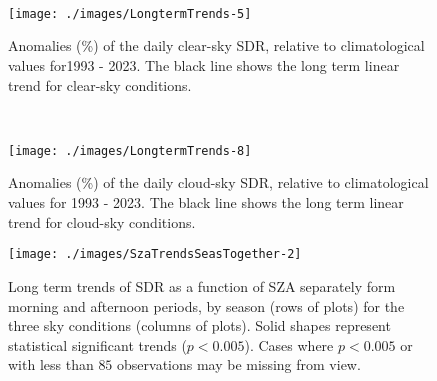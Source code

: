 \appendix
\section{}


\  \


\begin{figure}[h!]
{\centering \texttt{[image: ./images/LongtermTrends-5]}

}
\caption{Anomalies (\%) of the daily clear-sky SDR, relative to climatological values for1993 - 2023. The black line shows the long term linear trend for clear-sky conditions.}\label{fig:trendCLEAR}
\end{figure}

\  \

\begin{figure}[h!]
{\centering \texttt{[image: ./images/LongtermTrends-8]}

}
\caption{Anomalies (\%) of the daily cloud-sky SDR, relative to climatological values for 1993 - 2023. The black line shows the long term linear trend for cloud-sky conditions.}\label{fig:trendCLOUD}
\end{figure}



\begin{figure}[h!]
{\centering \texttt{[image: ./images/SzaTrendsSeasTogether-2]}

}
\caption{Long term trends of SDR as a function of SZA separately form morning and afternoon
periods, by season (rows of plots) for the three sky conditions (columns of plots).
Solid shapes represent statistical significant trends ($p<0.005$).
Cases where $p<0.005$ or with less than $85$ observations may be missing from view.}\label{fig:SZAtrendSeason}
\end{figure}

